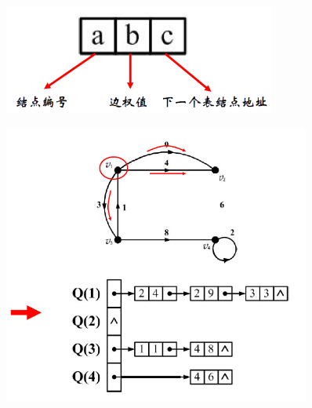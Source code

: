\documentclass[11pt,a4paper,openany]{book}
\begin{document}
\begin{figure}[H]
  \centering
  \includegraphics[width=0.8\textwidth]{1.17.1.png}\\
  \caption*{}
\end{figure}
\begin{figure}[H]
  \centering
  \includegraphics[width=0.9\textwidth]{1.18.png}\\
  \caption*{}
\end{figure}
\end{document}
